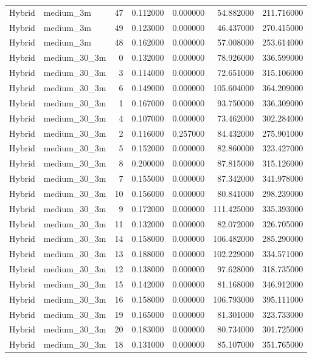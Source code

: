 \begin{tabular}{llrrrrr}
Hybrid & medium_3m & 47 & 0.112000 & 0.000000 & 54.882000 & 211.716000 \\
Hybrid & medium_3m & 49 & 0.123000 & 0.000000 & 46.437000 & 270.415000 \\
Hybrid & medium_3m & 48 & 0.162000 & 0.000000 & 57.008000 & 253.614000 \\
Hybrid & medium_30_3m & 0 & 0.132000 & 0.000000 & 78.926000 & 336.599000 \\
Hybrid & medium_30_3m & 3 & 0.114000 & 0.000000 & 72.651000 & 315.106000 \\
Hybrid & medium_30_3m & 6 & 0.149000 & 0.000000 & 105.604000 & 364.209000 \\
Hybrid & medium_30_3m & 1 & 0.167000 & 0.000000 & 93.750000 & 336.309000 \\
Hybrid & medium_30_3m & 4 & 0.107000 & 0.000000 & 73.462000 & 302.284000 \\
Hybrid & medium_30_3m & 2 & 0.116000 & 0.257000 & 84.432000 & 275.901000 \\
Hybrid & medium_30_3m & 5 & 0.152000 & 0.000000 & 82.860000 & 323.427000 \\
Hybrid & medium_30_3m & 8 & 0.200000 & 0.000000 & 87.815000 & 315.126000 \\
Hybrid & medium_30_3m & 7 & 0.155000 & 0.000000 & 87.342000 & 341.978000 \\
Hybrid & medium_30_3m & 10 & 0.156000 & 0.000000 & 80.841000 & 298.239000 \\
Hybrid & medium_30_3m & 9 & 0.172000 & 0.000000 & 111.425000 & 335.393000 \\
Hybrid & medium_30_3m & 11 & 0.132000 & 0.000000 & 82.072000 & 326.705000 \\
Hybrid & medium_30_3m & 14 & 0.158000 & 0.000000 & 106.482000 & 285.290000 \\
Hybrid & medium_30_3m & 13 & 0.188000 & 0.000000 & 102.229000 & 334.571000 \\
Hybrid & medium_30_3m & 12 & 0.138000 & 0.000000 & 97.628000 & 318.735000 \\
Hybrid & medium_30_3m & 15 & 0.142000 & 0.000000 & 81.168000 & 346.912000 \\
Hybrid & medium_30_3m & 16 & 0.158000 & 0.000000 & 106.793000 & 395.111000 \\
Hybrid & medium_30_3m & 19 & 0.165000 & 0.000000 & 81.301000 & 323.733000 \\
Hybrid & medium_30_3m & 20 & 0.183000 & 0.000000 & 80.734000 & 301.725000 \\
Hybrid & medium_30_3m & 18 & 0.131000 & 0.000000 & 85.107000 & 351.765000 \\

\end{tabular}
